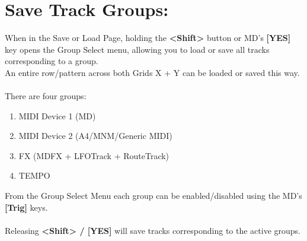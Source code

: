 \section{Save Track Groups:}
When in the Save or Load Page, holding the \textbf{<Shift>} button or MD's \textbf{[YES]} key opens the Group Select menu,
allowing you to load or save all tracks corresponding to a group.\\An entire row/pattern across both Grids X + Y can be loaded or saved this way.\\
\\
There are four groups:
\begin{enumerate}
    \item MIDI Device 1 (MD)
    \item MIDI Device 2 (A4/MNM/Generic MIDI)
    \item FX (MDFX + LFOTrack + RouteTrack)
    \item TEMPO
\end{enumerate}
From the Group Select Menu each group can be enabled/disabled using the MD's \textbf{[Trig]} keys.\\
\\
Releasing \textbf{<Shift> / [YES]} will save tracks corresponding to the active groups.


